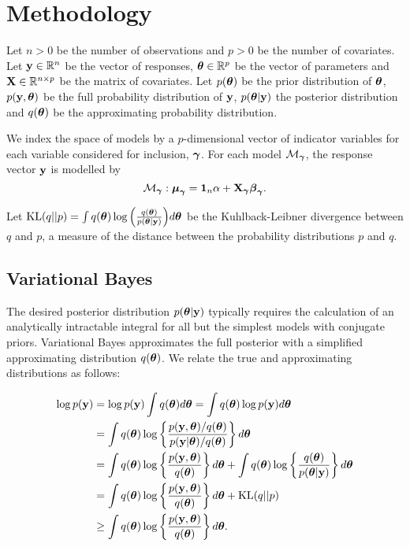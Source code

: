 \documentclass{amsart}[12pt]
\begin{document}
\section{Methodology}
\label{sec:methodology}

Let $n > 0$ be the number of observations and $p > 0$ be the number of covariates. Let ${\bf y} \in {\mathbb{R}}^n$ be the
vector of responses, ${\boldsymbol \theta} \in {\mathbb{R}}^p$ be the vector of parameters and ${\bf X} \in {\mathbb{R}}^{n \times p}$ be the
matrix of covariates. Let $p({\boldsymbol \theta})$ be the prior distribution of ${\boldsymbol \theta}$, $p({\bf y}, {\boldsymbol \theta})$ be the full
probability distribution of ${\bf y}$, $p({\boldsymbol \theta} | {\bf y})$ the posterior distribution and $q({\boldsymbol \theta})$ be the
approximating probability distribution.

We index the space of models by a $p$-dimensional vector of indicator variables for each variable considered 
for inclusion, ${\boldsymbol \gamma}$. For each model $\mathcal{M}_{\boldsymbol \gamma}$, the response vector ${\bf y}$ is modelled by
\begin{equation*}
\mathcal{M}_{\boldsymbol \gamma}: {\boldsymbol \mu}_{\boldsymbol \gamma} = {\bf 1}_n \alpha + {\bf X}_{\boldsymbol \gamma} {\boldsymbol \beta}_{\boldsymbol \gamma}.
\end{equation*}

Let $\text{KL}(q||p) = \int q({\boldsymbol \theta}) \log{\left( \frac{q({\boldsymbol\theta})}{p({\boldsymbol\theta}|{\bf y})} \right)} d {\boldsymbol \theta}$ be the
Kuhlback-Leibner divergence between $q$ and $p$, a measure of the distance between the probability
distributions $p$ and $q$.

\subsection{Variational Bayes}

The desired posterior distribution $p({\boldsymbol \theta} | {\bf y})$ typically requires the calculation of an analytically
intractable integral for all but the simplest models with conjugate priors. Variational Bayes approximates
the full posterior with a simplified approximating distribution $q({\boldsymbol \theta})$. We relate the true and 
approximating distributions as follows:

\begin{align*}
\log p({\bf y}) &= \log p({\bf y}) \int q({\boldsymbol \theta}) d {\boldsymbol \theta} = \int q({\boldsymbol \theta}) \log p({\bf y}) d {\boldsymbol \theta} \\
&= \int q({\boldsymbol \theta}) \log \left\{ \frac{p({\bf y}, {\boldsymbol \theta}) / q({\boldsymbol \theta})}{p({\bf y}|{\boldsymbol \theta}) / q({\boldsymbol \theta})} \right\} d {\boldsymbol \theta} \\
&= \int q({\boldsymbol \theta}) \log\left\{ \frac{p({\bf y}, {\boldsymbol \theta})}{q({\boldsymbol \theta})} \right\} d {\boldsymbol \theta} +
		\int q({\boldsymbol \theta}) \log\left\{ \frac{q({\boldsymbol \theta})}{p({\boldsymbol \theta}|{\bf y})} \right\} d {\boldsymbol \theta} \\
&= \int q({\boldsymbol \theta}) \log\left\{ \frac{p({\bf y}, {\boldsymbol \theta})}{q({\boldsymbol \theta})} \right\} d {\boldsymbol \theta} +
		\text{KL}(q||p) \\
&\geq \int q({\boldsymbol \theta}) \log\left\{ \frac{p({\bf y}, {\boldsymbol \theta})}{q({\boldsymbol \theta})} \right\} d {\boldsymbol \theta}.
\end{align*}
\end{document}
